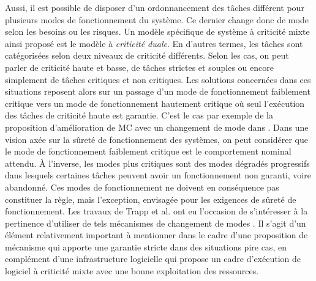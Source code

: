 \documentclass[french, a4paper, 11pt, twoside, pdftex]{StyleThese}
\begin{document}
    Aussi, il est possible de disposer d'un ordonnancement des tâches différent pour plusieurs modes de fonctionnement du système. Ce dernier change donc de mode selon les besoins ou les risques. Un modèle spécifique de système à criticité mixte ainsi proposé est le modèle à \textit{criticité duale}. En d'autres termes, les tâches sont catégorisées selon deux niveaux de criticité différents. Selon les cas, on peut parler de criticité haute et basse, de tâches strictes et souples ou encore simplement de tâches critiques et non critiques. Les solutions concernées dans ces situations reposent alors sur un passage d'un mode de fonctionnement faiblement critique vers un mode de fonctionnement hautement critique où seul l'exécution des tâches de criticité haute est garantie. C'est le cas par exemple de la proposition d'amélioration de MC avec un changement de mode dans \cite{chisholm_supporting_2017}. Dans une vision axée sur la sûreté de fonctionnement des systèmes, on peut considérer que le mode de fonctionnement faiblement critique est le comportement nominal attendu. À l'inverse, les modes plus critiques sont des modes dégradés progressifs dans lesquels certaines tâches peuvent avoir un fonctionnement non garanti, voire abandonné. Ces modes de fonctionnement ne doivent en conséquence pas constituer la règle, mais l'exception, envisagée pour les exigences de sûreté de fonctionnement. Les travaux de Trapp et al. ont eu l'occasion de s'intéresser à la pertinence d'utiliser de tels mécanismes de changement de modes \cite{trapp_runtime_2007}. Il s'agit d'un élément relativement important à mentionner dans le cadre d'une proposition de mécanisme qui apporte une garantie stricte dans des situations pire cas, en complément d'une infrastructure logicielle qui propose un cadre d'exécution de logiciel à criticité mixte avec une bonne exploitation des ressources.
    
\end{document}

